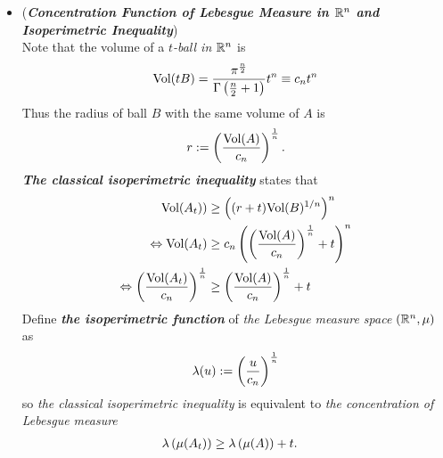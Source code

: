 \documentclass[11pt]{article}
\begin{document}
\begin{itemize}
\item \begin{example} (\textbf{\emph{Concentration Function of Lebesgue Measure in ${\mathbb R}^n$ and Isoperimetric Inequality}})\\
Note that the volume of a \emph{$t$-ball in ${\mathbb R}^n$} is 
\begin{align*}
\text{Vol}(tB) =  \frac{\pi^{\frac{n}{2}}}{\Gamma\left(\frac{n}{2} + 1\right)}t^n  \equiv c_n t^n 
\end{align*}  Thus the radius of ball $B$ with the same volume of $A$ is
\begin{align*}
r := \left(\frac{\text{Vol}(A) }{c_n}\right)^{\frac{1}{n}}.
\end{align*} \emph{\textbf{The classical isoperimetric inequality}} states that 
\begin{align}
 \text{Vol}(A_t)) &\ge \left( (r+  t)\text{Vol}(B)^{1/n}\right)^{n} \nonumber\\
 \Leftrightarrow  \text{Vol}(A_t) &\ge c_n\left(\left(\frac{\text{Vol}(A) }{c_n}\right)^{\frac{1}{n}} + t\right)^n \nonumber \\
  \Leftrightarrow  \left(\frac{\text{Vol}(A_t) }{c_n}\right)^{\frac{1}{n}}  &\ge \left(\frac{\text{Vol}(A) }{c_n}\right)^{\frac{1}{n}} + t  \label{ineqn: lebesgure_measure_concentration}
\end{align} Define  \emph{\textbf{the isoperimetric function}} of \emph{the Lebesgue measure space} $({\mathbb R}^n, \mu)$ as
\begin{align*}
\lambda(u) := \left(\frac{u}{c_n}\right)^{\frac{1}{n}}
\end{align*} so \emph{the classical isoperimetric inequality}  is equivalent to \emph{the concentration of Lebesgue measure}
\begin{align*}
\lambda\left(\mu(A_t)\right) &\ge \lambda\left(\mu(A)\right) + t. 
\end{align*}
\end{example}


\end{itemize}
\end{document}
